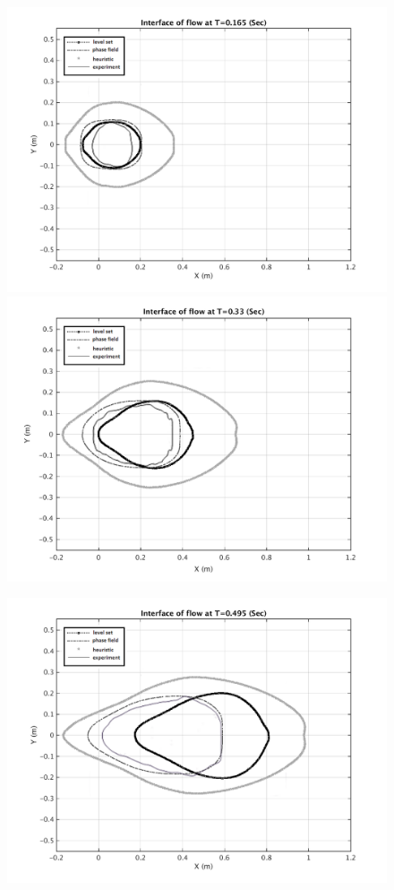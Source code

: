 \documentclass[letterpaper,10pt]{article}
\begin{document}
\begin{figure}[H]
  \begin{minipage}[b]{.48\linewidth}
    \centering
    \includegraphics[width=1\textwidth]{IMAGES/interface165exp.png}
    \includegraphics[width=1\textwidth]{IMAGES/interface330exp.png}
  \end{minipage}
  \begin{minipage}[b]{.48 \linewidth}
    \centering
    \includegraphics[width=1\textwidth]{IMAGES/interface495exp.png}

\end{minipage}
\end{figure}
\end{document}
